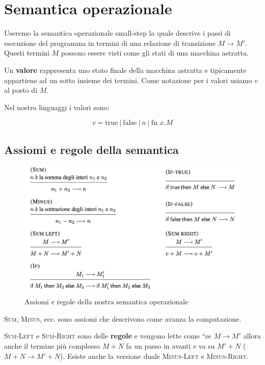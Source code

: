 

\section{Semantica operazionale}

Useremo la semantica operazionale small-step la quale descrive i passi di esecuzione del programma in termini di una relazione di transizione $M \rightarrow M'$.
Questi termini $M$ possono essere visti come gli stati di una macchina astratta.

Un \textbf{valore} rappresenta uno stato finale della macchina astratta e tipicamente appartiene ad un sotto insieme dei termini. Come notazione per i valori usiamo $v$ al posto di $M$.

Nel nostro linguaggi i valori sono:

$$
v = \text{true} \: | \: \text{false} \:|\: n \: | \: \text{fn }x.M
$$

\subsection{Assiomi e regole della semantica}

\begin{figure}[htpb]
	\centering
	\includegraphics[width = 0.7\linewidth]{./images/l3-assiomi}
	\caption{Assiomi e regole della nostra semantica operazionale}
\end{figure}

\textsc{Sum}, \textsc{Minus}, ecc. sono assiomi che descrivono come avanza la computazione.

\textsc{Sum-Left} e \textsc{Sum-Right} sono delle \textbf{regole} e vengono lette come ``se $M \rightarrow M'$ allora anche il termine più complesso $M + N$ fa un passo in avanti e va su $M' + N$ ($M + N \rightarrow M' +N$). Esiste anche la versione duale \textsc{Minus-Left} e \textsc{Minus-Right}.

